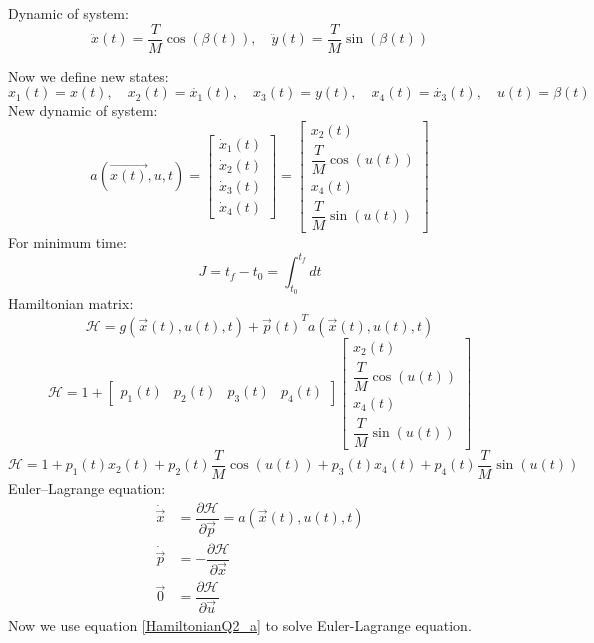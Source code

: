 Dynamic of  system:
$$\ddot{x}(t) = \dfrac{T}{M} \cos(\beta(t)),\quad \ddot{y}(t) = \dfrac{T}{M} \sin(\beta(t))$$

Now we define new states:
$$x_1(t) = x(t),\quad x_2(t) = \dot{x_1}(t),\quad x_3(t) = y(t),\quad x_4(t) = \dot{x_3}(t),\quad u(t) = \beta(t)$$
New dynamic of system:
$$a(\vec{x(t)}, u, t) = \begin{bmatrix}
	\dot{x}_1(t)\\
	\dot{x}_2(t)\\
	\dot{x}_3(t)\\
	\dot{x}_4(t)
\end{bmatrix} = \begin{bmatrix}
x_2(t)\\
\dfrac{T}{M} \cos(u(t))\\
x_4(t)\\
\dfrac{T}{M} \sin(u(t))
\end{bmatrix}$$
For minimum time:
$$J = t_f - t_0 = \int_{t_0}^{t_f} dt$$
Hamiltonian matrix:
$$\mathcal{H} =  g(\vec x(t), u(t), t) + {\vec{p}(t)}^Ta(\vec x(t), u(t), t)$$
$$\mathcal{H} = 1 + \begin{bmatrix} 
	p_1(t) & p_2(t) & p_3(t) & p_4(t)
\end{bmatrix} \begin{bmatrix}
x_2(t)\\
\dfrac{T}{M} \cos(u(t))\\
x_4(t)\\
\dfrac{T}{M} \sin(u(t))
\end{bmatrix}$$
\begin{equation} \label{HamiltonianQ2_a}
	\mathcal{H} = 1 + p_1(t)x_2(t) + p_2(t)\dfrac{T}{M}\cos(u(t)) +p_3(t)x_4(t) +p_4(t)\dfrac{T}{M}\sin(u(t))
\end{equation}
Euler–Lagrange equation:
\begin{align}
	\dot{\vec{x}} &= \dfrac{\partial \mathcal{H} }{\partial \vec{p}} = a(\vec x(t), u(t), t)\\
	\dot{\vec{p}} &= -\dfrac{\partial \mathcal{H} }{\partial \vec{x}} \\
	{\vec{0}} &= \dfrac{\partial \mathcal{H} }{\partial \vec{u}}
\end{align}
Now  we use equation \ref{HamiltonianQ2_a} to solve Euler-Lagrange equation.
